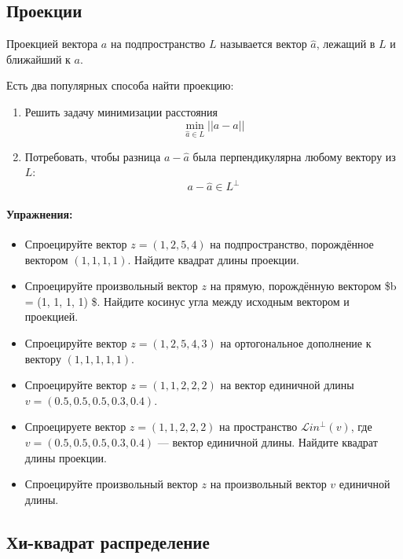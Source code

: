\documentclass[11pt,russian,]{article}
\let\oldparagraph\paragraph
\renewcommand{\paragraph}[1]{\oldparagraph{#1}\mbox{}}
\newcommand{\1}{\mathbbm{1}}
\newcommand{\Lin}{\mathcal{L}in}
\newcommand{\Linp}{\Lin^{\perp}}
\begin{document}
\subsection{Проекции}

Проекцией вектора \(a\) на подпространство \(L\) называется вектор
\(\hat a\), лежащий в \(L\) и ближайший к \(a\).

Есть два популярных способа найти проекцию:

\begin{enumerate}
\def\labelenumi{\arabic{enumi}.}
\item
  Решить задачу минимизации расстояния \[
  \min_{\hat a\in L} ||a - \hat a||
  \]
\item
  Потребовать, чтобы разница \(a-\hat a\) была перпендикулярна любому
  вектору из \(L\): \[
  a- \hat a \in L^{\perp}
  \]
\end{enumerate}

\paragraph{Упражнения:}\label{-1}

\begin{itemize}
\item
  Спроецируйте вектор \(z=(1, 2, 5, 4)\) на подпространство, порождённое
  вектором \((1, 1, 1, 1)\). Найдите квадрат длины проекции.
\item
  Спроецируйте произвольный вектор \(z\) на прямую, порождённую вектором
  \$b = (1, 1, 1, 1) \$. Найдите косинус угла между исходным вектором и
  проекцией.
\item
  Спроецируйте вектор \(z=(1, 2, 5, 4, 3)\) на ортогональное дополнение
  к вектору \((1, 1, 1, 1, 1)\).
\item
  Спроецируйте вектор \(z=(1, 1, 2, 2, 2)\) на вектор единичной длины
  \(v = (0.5, 0.5, 0.5, 0.3, 0.4)\).
\item
  Спроецируете вектор \(z=(1, 1, 2, 2, 2)\) на пространство
  \(\Linp(v)\), где \(v = (0.5, 0.5, 0.5, 0.3, 0.4)\) --- вектор
  единичной длины. Найдите квадрат длины проекции.
\item
  Спроецируйте произвольный вектор \(z\) на произвольный вектор \(v\)
  единичной длины.
\end{itemize}

\subsection{Хи-квадрат распределение}\label{--}
\end{document}
